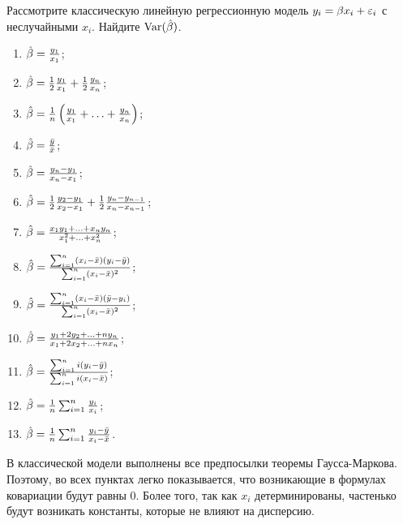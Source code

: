 \begin{problem}
Рассмотрите классическую линейную регрессионную модель $y_i = \beta x_i + \varepsilon_i$ с неслучайными $x_i$. Найдите $\operatorname{Var}(\hat{\beta})$.

\begin{enumerate}
\item $\hat{\beta} = \frac{y_1}{x_1}$;
\item $\hat{\beta} = \frac{1}{2} \frac{y_1}{x_1} + \frac{1}{2} \frac{y_n}{x_n}$;
\item $\hat{\beta} = \frac{1}{n} \left( \frac{y_1}{x_1} + \ldots + \frac{y_n}{x_n} \right)$;
\item $\hat{\beta} = \frac{\bar{y}}{\bar{x}}$;
\item $\hat{\beta} = \frac{y_n - y_1}{x_n - x_1}$;
\item $\hat{\beta} = \frac{1}{2} \frac{y_2 - y_1}{x_2 - x_1} + \frac{1}{2} \frac{y_n - y_{n-1}}{x_n - x_{n-1}}$;
\item $\hat{\beta} = \frac{x_1 y_1 + \ldots + x_n y_n}{x_1^2 + \ldots + x_n^2}$;
\item $\hat{\beta} = \frac{\sum_{i=1}^n (x_i - \bar{x})(y_i - \bar{y})}{\sum_{i=1}^n (x_i - \bar{x})^2}$;
\item $\hat{\beta} = \frac{\sum_{i=1}^n (x_i - \bar{x})(\bar{y} - y_i)}{\sum_{i=1}^n (x_i - \bar{x})^2}$;
\item $\hat{\beta} = \frac{y_1 + 2 y_2 + \ldots + n y_n}{x_1 + 2 x_2 + \ldots + n x_n}$;
\item $\hat{\beta} = \frac{\sum_{i=1}^n i(y_i - \bar{y})}{\sum_{i=1}^n i(x_i - \bar{x})}$;
\item $\hat{\beta} = \frac{1}{n} \sum_{i=1}^n \frac{y_i}{x_i}$;
\item $\hat{\beta} = \frac{1}{n} \sum_{i=1}^n \frac{y_i - \bar{y}}{x_i - \bar{x}}$.
\end{enumerate}


\begin{sol}
В классической модели выполнены все предпосылки теоремы Гаусса-Маркова. Поэтому, во всех пунктах легко показывается, что возникающие в формулах ковариации будут равны 0. Более того, так как $x_i$ детерминированы, частенько будут возникать константы, которые не влияют на дисперсию.


\end{sol}
\end{problem}
